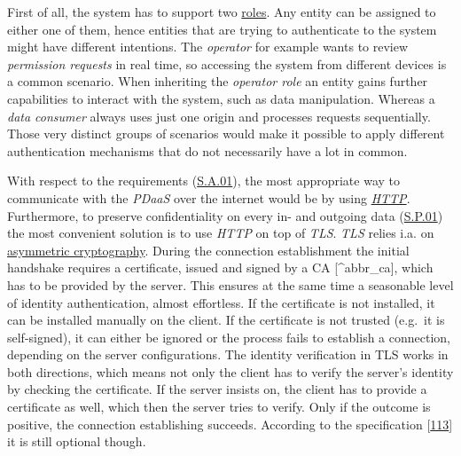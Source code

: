 \documentclass[12pt,english,a4paper,titlepage,cleardoublepage=empty,dottedtoc]{report}
\begin{document}
First of all, the system has to support two
\protect\hyperlink{sa03}{roles}. Any entity can be assigned to either
one of them, hence entities that are trying to authenticate to the
system might have different intentions. The \emph{operator} for example
wants to review \emph{permission requests} in real time, so accessing
the system from different devices is a common scenario. When inheriting
the \emph{operator role} an entity gains further capabilities to
interact with the system, such as data manipulation. Whereas a
\emph{data consumer} always uses just one origin and processes requests
sequentially. Those very distinct groups of scenarios would make it
possible to apply different authentication mechanisms that do not
necessarily have a lot in common.

With respect to the requirements (\protect\hyperlink{sa01}{S.A.01}), the
most appropriate way to communicate with the \emph{PDaaS} over the
internet would be by using \emph{\protect\hyperlink{link_http}{HTTP}}.
Furthermore, to preserve confidentiality on every in- and outgoing data
(\protect\hyperlink{sp01}{S.P.01}) the most convenient solution is to
use \emph{HTTP} on top of \emph{TLS}. \emph{TLS} relies i.a. on
\protect\hyperlink{link_asym-crypto}{asymmetric cryptography}. During
the connection establishment the initial handshake requires a
certificate, issued and signed by a CA {[}\^{}abbr\_ca{]}, which has to
be provided by the server. This ensures at the same time a seasonable
level of identity authentication, almost effortless. If the certificate
is not installed, it can be installed manually on the client. If the
certificate is not trusted (e.g.~it is self-signed), it can either be
ignored or the process fails to establish a connection, depending on the
server configurations. The identity verification in TLS works in both
directions, which means not only the client has to verify the server's
identity by checking the certificate. If the server insists on, the
client has to provide a certificate as well, which then the server tries
to verify. Only if the outcome is positive, the connection establishing
succeeds. According to the specification
{[}\protect\hyperlink{ref-web_spec_tls-12_client-auth}{113}{]} it is
still optional though.
\end{document}
